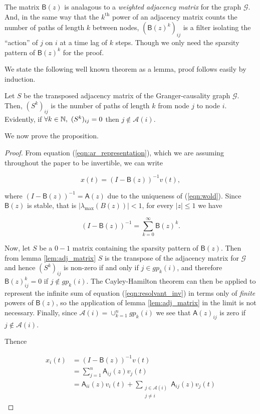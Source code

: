 \documentclass[12pt]{article}
\def\gcg{\mathcal{G}}  %
\def\B{\mathsf{B}}  %
\def\A{\mathsf{A}}  %
\newcommand{\anc}[1]{\mathcal{A}(#1)}  %
\newcommand{\gpn}[2]{gp_{#1}(#2)}  %
\begin{document}
The matrix $\B(z)$ is analagous to a \textit{weighted adjacency
  matrix} for the graph $\gcg$.  And, in the same way that the
$k^{\text{th}}$ power of an adjacency matrix counts the number of
paths of length $k$ between nodes, $(\B(z)^k)_{ij}$ is a filter
isolating the ``action'' of $j$ on $i$ at a time lag of $k$ steps.
Though we only need the sparsity pattern of $\B(z)^k$ for the proof.

We state the following well known theorem as a lemma, proof follows
easily by induction.

\begin{lemma}
  \label{lem:adj_matrix}
  Let $S$ be the transposed adjacency matrix of the Granger-causality
  graph $\gcg$.  Then, $(S^k)_{ij}$ is the number of paths of length
  $k$ from node $j$ to node $i$.  Evidently, if
  $\forall k \in \mathbb{N},\ (S^k)_{ij} = 0$ then $j \not\in \anc{i}$.
\end{lemma}

We now prove the proposition.

\begin{proof}
  From equation (\ref{eqn:ar_representation}), which we are assuming
  throughout the paper to be invertible, we can write

  \begin{equation*}
    x(t) = (I - \B(z))^{-1} v(t),
  \end{equation*}

  where $(I - \B(z))^{-1} = \A(z)$ due to the uniqueness of
  (\ref{eqn:wold}).  Since $\B(z)$ is stable, that is
  $|\lambda_{\text{max}}(B(z))| < 1$, for every $|z| \le 1$ we have

  \begin{equation}
    \label{eqn:resolvant_inv}
    (I - \B(z))^{-1} = \sum_{k = 0}^\infty \B(z)^k.
  \end{equation}

  Now, let $S$ be a $0-1$ matrix containing the sparsity pattern of
  $\B(z)$.  Then from lemma \ref{lem:adj_matrix} $S$ is the transpose
  of the adjacency matrix for $\gcg$ and hence $(S^k)_{ij}$ is
  non-zero if and only if $j \in \gpn{k}{i}$, and therefore
  $\B(z)^k_{ij} = 0$ if $j \not \in \gpn{k}{i}$.  The Cayley-Hamilton
  theorem can then be applied to represent the infinite sum of equation
  (\ref{eqn:resolvant_inv}) in terms only of \textit{finite} powers of
  $\B(z)$, so the application of lemma \ref{lem:adj_matrix} in the
  limit is not necessary.  Finally, since $\anc{i} = \cup_{k = 1}^n\gpn{k}{i}$
  we see that $\A(z)_{ij}$ is zero if $j \not\in \anc{i}$.

  Thence

  \begin{align*}
    x_i(t) &= (I - \B(z))^{-1}v(t)\\
    &= \sum_{j = 1}^n \A_{ij}(z) v_j(t)\\
    &= \A_{ii}(z) v_i(t) + \sum_{\substack{j \in \anc{i} \\ j \ne i}} \A_{ij}(z) v_j(t)
  \end{align*}
\end{proof}
\end{document}
